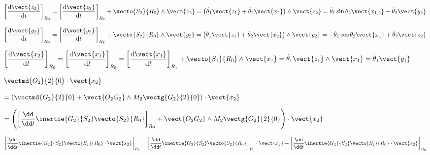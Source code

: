 \begin{corrige}
$\left[\dfrac{\text{d} \vect{z_2}}{\text{d} t}\right]_{R_0}
=\left[\dfrac{\text{d} \vect{z_2}}{\text{d} t}\right]_{R_2} + \vecto{S_2}{R_0}\wedge\vect{z_2}
= \left( \dot{\theta}_1 \vect{z_1}+\dot{\theta}_2 \vect{x_2}\right) \wedge \vect{z_2}
= \dot{\theta}_1 \sin\theta_2 \vect{x_{1,2}} -\dot{\theta}_2 \vect{y_2} 
$


$\left[\dfrac{\text{d} \vect{y_2}}{\text{d} t}\right]_{R_0}
=\left[\dfrac{\text{d} \vect{y_2}}{\text{d} t}\right]_{R_2} + \vecto{S_2}{R_0}\wedge\vect{y_2}
= \left( \dot{\theta}_1 \vect{z_1}+\dot{\theta}_2 \vect{x_2}\right) \wedge \vect{y_2}
= -\dot{\theta}_1 \cos\theta_2\vect{x_1}+\dot{\theta}_2 \vect{z_2}
$


$\left[\dfrac{\text{d} \vect{x_2}}{\text{d} t}\right]_{R_0}
=\left[\dfrac{\text{d} \vect{x_1}}{\text{d} t}\right]_{R_0}
=\left[\dfrac{\text{d} \vect{x_1}}{\text{d} t}\right]_{R_1} + \vecto{S_1}{R_0}\wedge\vect{x_1}
=\dot{\theta}_1 \vect{z_1} \wedge  \vect{x_1}
=\dot{\theta}_1 \vect{y_1}$




\end{corrige}
\else
\fi


\ifprof
\begin{corrige}


$\vectmd{O_2}{2}{0}\cdot \vect{x_2}$

$= \left( \vectmd{G_2}{2}{0}+\vect{O_2G_2}\wedge M_2\vectg{G_2}{2}{0}\right)\cdot \vect{x_2}$

$= \left( \left[\dfrac{\dd}{\dd t}\inertie{G_2}{S_2}\vecto{S_2}{R_0}\right]_{R_0}
+\vect{O_2G_2}\wedge M_2\vectg{G_2}{2}{0}\right)\cdot \vect{x_2}$

$\left[\dfrac{\dd}{\dd t}\inertie{G_2}{S_2}\vecto{S_2}{R_0} \cdot \vect{x_2} \right]_{R_0}
=\left[\dfrac{\dd}{\dd t}\inertie{G_2}{S_2}\vecto{S_2}{R_0}  \right]_{R_0}\cdot \vect{x_2}+\left[\dfrac{\dd}{\dd t}\inertie{G_2}{S_2}\vecto{S_2}{R_0} \cdot \vect{x_2} \right]_{R_0}$
\end{corrige}
\else
\fi





